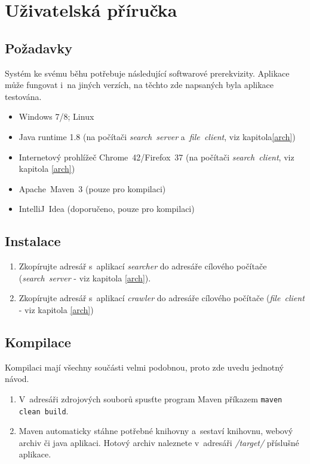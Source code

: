 \chapter{Uživatelská příručka}
\section{Požadavky}
Systém ke svému běhu potřebuje následující softwarové prerekvizity. Aplikace může fungovat i~na jiných verzích, na těchto zde napsaných byla aplikace testována.
\begin{itemize}
\item Windows 7/8; Linux
\item Java runtime 1.8 (na počítači \emph{search~server} a~\emph{file~client}, viz kapitola\ref{arch})
\item Internetový prohlížeč Chrome~42/Firefox~37 (na počítači \emph{search~client}, viz kapitola \ref{arch})
\item Apache~Maven~3 (pouze pro kompilaci)
\item IntelliJ~Idea (doporučeno, pouze pro kompilaci)
\end{itemize}

\section{Instalace}
\begin{enumerate}
\item Zkopírujte adresář s~aplikací \emph{searcher} do adresáře cílového počítače (\emph{search~server} - viz kapitola \ref{arch}).
\item Zkopírujte adresář s~aplikací \emph{crawler} do adresáře cílového počítače (\emph{file~client} - viz kapitola \ref{arch})
\end{enumerate}

\section{Kompilace}
Kompilaci mají všechny součásti velmi podobnou, proto zde uvedu jednotný návod.
\begin{enumerate}
\item V~adresáři zdrojových souborů spusťte program Maven příkazem \verb|maven clean build|.
\item Maven automaticky stáhne potřebné knihovny a~sestaví knihovnu, webový archiv či java aplikaci. Hotový archiv naleznete v~adresáři \emph{/target/} příslušné aplikace.
\end{enumerate} 

